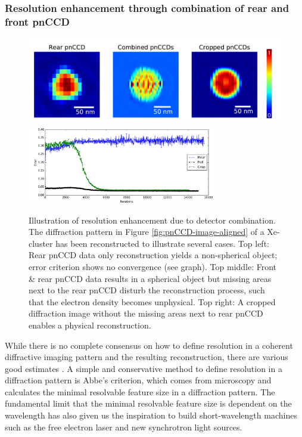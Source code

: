 \subsubsection{Resolution enhancement through combination of rear and front pnCCD}\label{sec:resolution-discussion}
\begin{figure}
  \begin{center}
   \includegraphics[width=1\linewidth]{images/Phase-retrieval-image.png}\\
   \includegraphics[height=3.5cm]{images/Phase-retrieval-error.png}
    \caption[Illustration of resolution enhancement and diffraction image cropping.]{Illustration of resolution enhancement due to detector combination. The diffraction pattern in Figure \ref{fig:pnCCD-image-aligned} of a Xe-cluster has been reconstructed to illustrate several cases. Top left: Rear pnCCD data only reconstruction yields a non-spherical object; error criterion shows no convergence (see graph). Top middle: Front \& rear pnCCD data results in a spherical object but missing areas next to the rear pnCCD disturb the reconstruction process, such that the electron density becomes unphysical. Top right: A cropped diffraction image without the missing areas next to rear pnCCD enables a physical reconstruction.}
\label{fig:phase-retrieval-image}
  \end{center}
\end{figure}
While there is no complete consensus on how to define resolution in a coherent diffractive imaging pattern and the resulting reconstruction, there are various good estimates \cite{Geilhufe-2014-OptcsExp,Ekeberg-2015-PRL,Chapman-2006-JOSA}. A simple and conservative method to define resolution in a diffraction pattern is Abbe's criterion, which comes from microscopy and calculates the minimal resolvable feature size in a diffraction pattern. The fundamental limit that the minimal resolvable feature size is dependent on the wavelength has also given us the inspiration to build short-wavelength machines such as the free electron laser and new synchrotron light sources.\\[1\baselineskip]
